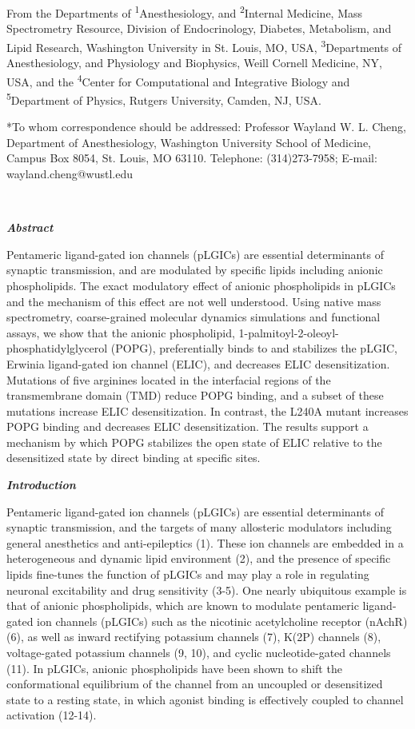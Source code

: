From the Departments of \textsuperscript{1}Anesthesiology, and
\textsuperscript{2}Internal Medicine, Mass Spectrometry Resource,
Division of Endocrinology, Diabetes, Metabolism, and Lipid Research,
Washington University in St. Louis, MO, USA,
\textsuperscript{3}Departments of Anesthesiology, and Physiology and
Biophysics, Weill Cornell Medicine, NY, USA, and the
\textsuperscript{4}Center for Computational and Integrative Biology and
\textsuperscript{5}Department of Physics, Rutgers University, Camden,
NJ, USA.

*To whom correspondence should be addressed: Professor Wayland W. L.
Cheng, Department of Anesthesiology, Washington University School of
Medicine, Campus Box 8054, St. Louis, MO 63110. Telephone:
(314)273-7958; E-mail: wayland.cheng@wustl.edu

\textbf{\emph{\\
}}

\textbf{\emph{Abstract}}

Pentameric ligand-gated ion channels (pLGICs) are essential determinants
of synaptic transmission, and are modulated by specific lipids including
anionic phospholipids. The exact modulatory effect of anionic
phospholipids in pLGICs and the mechanism of this effect are not well
understood. Using native mass spectrometry, coarse-grained molecular
dynamics simulations and functional assays, we show that the anionic
phospholipid, 1-palmitoyl-2-oleoyl-phosphatidylglycerol (POPG),
preferentially binds to and stabilizes the pLGIC, Erwinia ligand-gated
ion channel (ELIC), and decreases ELIC desensitization. Mutations of
five arginines located in the interfacial regions of the transmembrane
domain (TMD) reduce POPG binding, and a subset of these mutations
increase ELIC desensitization. In contrast, the L240A mutant increases
POPG binding and decreases ELIC desensitization. The results support a
mechanism by which POPG stabilizes the open state of ELIC relative to
the desensitized state by direct binding at specific sites.

\textbf{\emph{Introduction}}

Pentameric ligand-gated ion channels (pLGICs) are essential determinants
of synaptic transmission, and the targets of many allosteric modulators
including general anesthetics and anti-epileptics (1). These ion
channels are embedded in a heterogeneous and dynamic lipid environment
(2), and the presence of specific lipids fine-tunes the function of
pLGICs and may play a role in regulating neuronal excitability and drug
sensitivity (3-5). One nearly ubiquitous example is that of anionic
phospholipids, which are known to modulate pentameric ligand-gated ion
channels (pLGICs) such as the nicotinic acetylcholine receptor (nAchR)
(6), as well as inward rectifying potassium channels (7), K(2P) channels
(8), voltage-gated potassium channels (9, 10), and cyclic
nucleotide-gated channels (11). In pLGICs, anionic phospholipids have
been shown to shift the conformational equilibrium of the channel from
an uncoupled or desensitized state to a resting state, in which agonist
binding is effectively coupled to channel activation (12-14).


